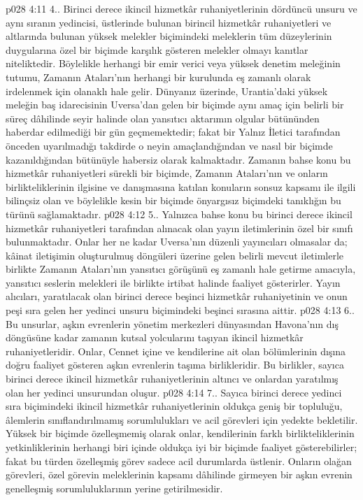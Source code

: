 \vs p028 4:11 4.\bibnobreakspace {}. Birinci derece ikincil hizmetkâr ruhaniyetlerinin dördüncü unsuru ve aynı sıranın yedincisi, üstlerinde bulunan birincil hizmetkâr ruhaniyetleri ve altlarında bulunan yüksek melekler biçimindeki meleklerin tüm düzeylerinin duygularına özel bir biçimde karşılık gösteren melekler olmayı kanıtlar niteliktedir. Böylelikle herhangi bir emir verici veya yüksek denetim meleğinin tutumu, Zamanın Ataları’nın herhangi bir kurulunda eş zamanlı olarak irdelenmek için olanaklı hale gelir. Dünyanız üzerinde, Urantia’daki yüksek meleğin baş idarecisinin Uversa’dan gelen bir biçimde aynı amaç için belirli bir süreç dâhilinde seyir halinde olan yansıtıcı aktarımın olgular bütününden haberdar edilmediği bir gün geçmemektedir; fakat bir Yalnız İletici tarafından önceden uyarılmadığı takdirde o neyin amaçlandığından ve nasıl bir biçimde kazanıldığından bütünüyle habersiz olarak kalmaktadır. Zamanın bahse konu bu hizmetkâr ruhaniyetleri sürekli bir biçimde, Zamanın Ataları’nın ve onların birlikteliklerinin ilgisine ve danışmasına katılan konuların sonsuz kapsamı ile ilgili bilinçsiz olan ve böylelikle kesin bir biçimde önyargısız biçimdeki tanıklığın bu türünü sağlamaktadır.
\vs p028 4:12 5.\bibnobreakspace {}. Yalnızca bahse konu bu birinci derece ikincil hizmetkâr ruhaniyetleri tarafından alınacak olan yayın iletimlerinin özel bir sınıfı bulunmaktadır. Onlar her ne kadar Uversa’nın düzenli yayıncıları olmasalar da; kâinat iletişimin oluşturulmuş döngüleri üzerine gelen belirli mevcut iletimlerle birlikte Zamanın Ataları’nın yansıtıcı görüşünü eş zamanlı hale getirme amacıyla, yansıtıcı seslerin melekleri ile birlikte irtibat halinde faaliyet gösterirler. Yayın alıcıları, yaratılacak olan birinci derece beşinci hizmetkâr ruhaniyetinin ve onun peşi sıra gelen her yedinci unsuru biçimindeki beşinci sırasına aittir.
\vs p028 4:13 6.\bibnobreakspace {}. Bu unsurlar, aşkın evrenlerin yönetim merkezleri dünyasından Havona’nın dış döngüsüne kadar zamanın kutsal yolcularını taşıyan ikincil hizmetkâr ruhaniyetleridir. Onlar, Cennet içine ve kendilerine ait olan bölümlerinin dışına doğru faaliyet gösteren aşkın evrenlerin taşıma birlikleridir. Bu birlikler, sayıca birinci derece ikincil hizmetkâr ruhaniyetlerinin altıncı ve onlardan yaratılmış olan her yedinci unsurundan oluşur.
\vs p028 4:14 7.\bibnobreakspace {}. Sayıca birinci derece yedinci sıra biçimindeki ikincil hizmetkâr ruhaniyetlerinin oldukça geniş bir topluluğu, âlemlerin sınıflandırılmamış sorumlulukları ve acil görevleri için yedekte bekletilir. Yüksek bir biçimde özelleşmemiş olarak onlar, kendilerinin farklı birlikteliklerinin yetkinliklerinin herhangi biri içinde oldukça iyi bir biçimde faaliyet gösterebilirler; fakat bu türden özelleşmiş görev sadece acil durumlarda üstlenir. Onların olağan görevleri, özel görevin meleklerinin kapsamı dâhilinde girmeyen bir aşkın evrenin genelleşmiş sorumluluklarının yerine getirilmesidir.
